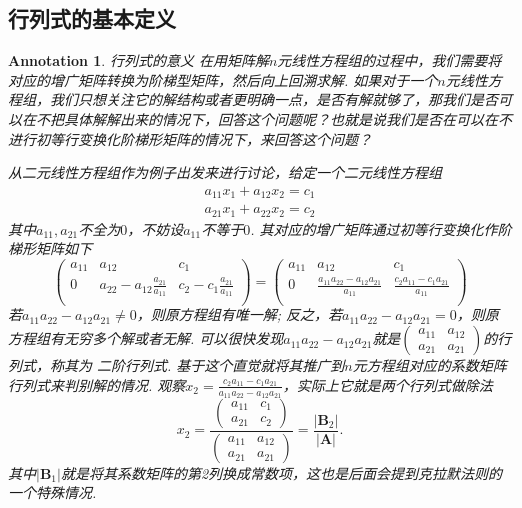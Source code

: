 \documentclass{article}
\newtheorem{annotation}[theorem]{Annotation}
\newcommand{\mbf}[1]{\bm{#1}}
\begin{document}
\subsection{行列式的基本定义}
\begin{annotation}
\rm {\color{red} 行列式的意义} 在用矩阵解$n$元线性方程组的过程中，我们需要将对应的增广矩阵转换为阶梯型矩阵，然后向上回溯求解. 如果对于一个$n$元线性方程组，我们只想关注它的解结构或者更明确一点，是否有解就够了，那我们是否可以在不把具体解解出来的情况下，回答这个问题呢？也就是说我们是否在可以在不进行初等行变换化阶梯形矩阵的情况下，来回答这个问题？

从二元线性方程组作为例子出发来进行讨论，给定一个二元线性方程组
$$
\begin{array}{ll}
a_{11}x_1 + a_{12}x_2 = c_1 \\
a_{21}x_1 + a_{22}x_2 = c_2
\end{array}
$$
其中$a_{11},a_{21}$不全为$0$，不妨设$a_{11}$不等于$0$. 其对应的增广矩阵通过初等行变换化作阶梯形矩阵如下
$$
\begin{pmatrix}
a_{11} & a_{12} & c_1 \\
0 & a_{22}-a_{12}\frac{a_{21}}{a_{11}} & c_2 -c_1\frac{a_{21}}{a_{11}} \\
\end{pmatrix}
=
\begin{pmatrix}
a_{11} & a_{12} & c_1 \\ 
0 & \frac{a_{11}a_{22}-a_{12}a_{21}}{a_{11}} & \frac{c_2a_{11}-c_1a_{21}}{a_{11}} \\
\end{pmatrix}
$$
若$a_{11}a_{22}-a_{12}a_{21} \neq 0$，则原方程组有唯一解; 反之，若$a_{11}a_{22}-a_{12}a_{21} = 0$，则原方程组有无穷多个解或者无解. 可以很快发现$a_{11}a_{22}-a_{12}a_{21}$就是$\begin{pmatrix}
a_{11} & a_{12} \\
a_{21} & a_{21} 
\end{pmatrix}$的行列式，称其为{\color{red} 二阶行列式}. 基于这个直觉就将其推广到$n$元方程组对应的系数矩阵行列式来判别解的情况. 观察$x_2 = \frac{c_2a_{11}-c_1a_{21}}{a_{11}a_{22}-a_{12}a_{21}}$，实际上它就是两个行列式做除法
$$
x_2 = \frac{\begin{pmatrix}
a_{11} & c_1\\
a_{21} & c_2 
\end{pmatrix}}{\begin{pmatrix}
a_{11} & a_{12} \\
a_{21} & a_{21} 
\end{pmatrix}}
=\frac{|\mbf{B}_2|}{|\mbf{A}|}.
$$
其中$|\mbf{B}_1|$就是将其系数矩阵的第2列换成常数项，这也是后面会提到{\color{red}克拉默法则}的一个特殊情况.
\end{annotation}
\end{document}
